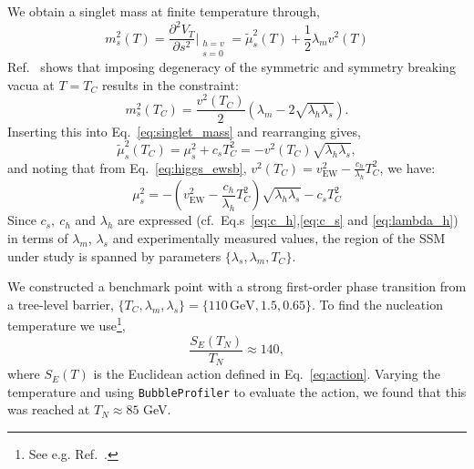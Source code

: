 \documentclass[final,3p,11pt,pdflatex]{elsarticle}
\makeatletter
\newcommand{\bp}{\texttt{BubbleProfiler}\@\xspace}
\renewcommand{\refeq}[1]{Eq.~\ref{#1}}
\newcommand{\refeqs}[1]{Eq.s~\ref{#1}}
\newcommand{\refcite}[1]{Ref.~\cite{#1}}
\makeatother
\begin{document}
We obtain a  singlet mass at finite temperature through,
%
\begin{equation}
m_s^2(T) = \frac{\partial^2 V_T}{\partial s^2}\bigg|_{\substack{h = v\\s = 0}} = \tilde{\mu}_s^2(T) + \frac{1}{2} \lambda_m v^2(T)
\label{eq:singlet_mass}
\end{equation}
\refcite{EspinosaStrongElectroweakPhase2012} shows that imposing degeneracy of the symmetric and symmetry breaking vacua at $T = T_C$ results in the constraint:
%
\begin{equation}
m_s^2(T_C) = \frac{v^2(T_C)}{2}(\lambda_m - 2 \sqrt{\lambda_h \lambda_s}).
\end{equation}
%
Inserting this into \refeq{eq:singlet_mass} and rearranging gives,
%
\begin{equation}
\tilde{\mu}_s^2(T_C) = \mu_s^2 + c_s T_C^2 = - v^2(T_C) \sqrt{\lambda_h \lambda_s},
\end{equation}
%
and noting that from \refeq{eq:higgs_ewsb}, $v^2(T_C) = v^2_\text{EW} - \frac{c_h}{\lambda_h} T_C^2$, we have:
%
\begin{equation}
\mu_s^2 = -(v^2_\text{EW} - \frac{c_h}{\lambda_h}T_C^2)\sqrt{\lambda_h \lambda_s} - c_s T_C^2
\end{equation}
%
Since $c_s,\ c_h$ and $\lambda_h$ are expressed (cf.\ \refeqs{eq:c_h},\ref{eq:c_s} and \ref{eq:lambda_h}) in terms of $\lambda_m$, $\lambda_s$ and experimentally measured values, the region of the SSM under study is spanned by parameters $\{\lambda_s, \lambda_m, T_C\}$.

We constructed a benchmark point with a strong first-order phase
transition from a tree-level barrier, $\{T_C,\lambda_m,\lambda_s\} =
\{110\,\text{GeV}, 1.5, 0.65\}$. To find the nucleation temperature we
use\footnote{See e.g. Ref.\ \cite[Ch 4.4]{White:2016nbo}.},
%
\begin{equation}
  \frac{S_E(T_N)}{T_N} \approx 140,
  \label{Eq:Nucleation_temp}
\end{equation}
%
where $S_E(T)$ is the Euclidean action defined in
\refeq{eq:action}. Varying the temperature and using \bp to evaluate
the action, we found that this was reached at $T_N \approx 85$
GeV.
\end{document}
